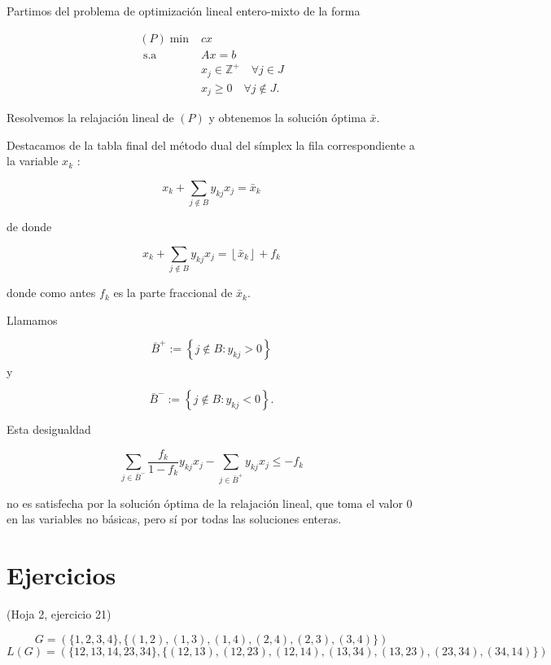 \documentclass[openany]{book}
\begin{document}
Partimos del problema de optimización lineal entero-mixto de la forma

$$
\begin{aligned}
(P) \min & c x \\
\text { s.a } & A x=b \\
& x_{j} \in \mathbb{Z}^{+} \quad \forall j \in J \\
& x_{j} \geq 0 \quad \forall j \notin J .
\end{aligned}
$$

Resolvemos la relajación lineal de $(P)$ y obtenemos la solución óptima $\bar{x}$.

Destacamos de la tabla final del método dual del símplex la fila correspondiente a la variable $x_{k}$ :

$$
x_{k}+\sum_{j \notin B} y_{k j} x_{j}=\bar{x}_{k}
$$

de donde

$$
x_{k}+\sum_{j \notin B} y_{k j} x_{j}=\left\lfloor\bar{x}_{k}\right\rfloor+f_{k}
$$

donde como antes $f_{k}$ es la parte fraccional de $\bar{x}_{k}$.

Llamamos

$$
\bar{B}^{+}:=\left\{j \notin B: y_{k j}>0\right\}
$$

$\mathrm{y}$

$$
\bar{B}^{-}:=\left\{j \notin B: y_{k j}<0\right\} .
$$

Esta desigualdad

$$
\sum_{j \in \bar{B}^{-}} \frac{f_{k}}{1-f_{k}} y_{k j} x_{j}-\sum_{j \in \bar{B}^{+}} y_{k j} x_{j} \leq-f_{k}
$$

no es satisfecha por la solución óptima de la relajación lineal, que toma el valor 0 en las variables no básicas, pero sí por todas las soluciones enteras.





\chapter{Ejercicios}

\begin{exercise}
  (Hoja 2, ejercicio 21)
\end{exercise}

$$ G = (\{ 1,2,3,4 \}, \{ (1,2), (1,3), (1,4), (2,4), (2,3), (3,4) \}) $$
$$ L(G)= (\{ 12, 13, 14, 23, 34 \}, \{ (12, 13), (12, 23), (12,14), (13,34), (13,23), (23, 34), (34, 14) \}) $$
\end{document}
